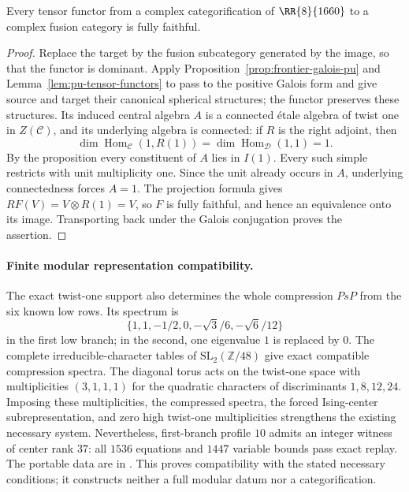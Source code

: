 \begin{samepage}
\begin{corollary}\label{cor:1660-twist-one-quotient}
Every tensor functor from a complex categorification of
$\RR{8}{1660}$ to a complex fusion category is fully faithful.
\end{corollary}
\begin{proof}
Replace the target by the fusion subcategory generated by the image,
so that the functor is dominant. Apply Proposition~\ref{prop:frontier-galois-pu} and
Lemma~\ref{lem:pu-tensor-functors} to pass to the positive Galois form
and give source and target their canonical spherical structures; the
functor preserves these structures. Its induced central algebra $A$ is a connected
\'etale algebra of twist one in $Z(\mathcal C)$, and its underlying
algebra is connected: if $R$ is the right adjoint, then
\[
 \dim\operatorname{Hom}_{\mathcal C}(1,R(1))
 =\dim\operatorname{Hom}_{\mathcal D}(1,1)=1.
\]
By the proposition every constituent of $A$ lies in $I(1)$.
Every such simple restricts with unit multiplicity one. Since the
unit already occurs in $A$, underlying connectedness forces $A=1$.
The projection formula gives $RF(V)=V\otimes R(1)=V$, so $F$ is
fully faithful, and hence an equivalence onto its image. Transporting
back under the Galois conjugation proves the assertion.
\end{proof}
\end{samepage}

\paragraph{Finite modular representation compatibility.}
The exact twist-one support also determines the whole compression
$PsP$ from the six known low rows.  Its spectrum is
\[
 \{1,1,-1/2,0,-\sqrt3/6,-\sqrt6/12\}
\]
in the first low branch; in the second, one eigenvalue $1$ is replaced
by $0$.  The complete irreducible-character tables of
$\mathrm{SL}_2(\mathbb Z/48)$ give exact compatible compression
spectra.  The diagonal torus acts on the twist-one space with
multiplicities $(3,1,1,1)$ for the quadratic characters of
discriminants $1,8,12,24$.  Imposing these multiplicities, the
compressed spectra, the forced Ising-center subrepresentation, and
zero high twist-one multiplicities strengthens the existing
necessary system.  Nevertheless, first-branch profile $10$ admits
an integer witness of center rank $37$: all $1536$ equations and
$1447$ variable bounds pass exact replay.  The portable data are in
.
This proves compatibility with the stated necessary conditions;
it constructs neither a full modular datum nor a categorification.

